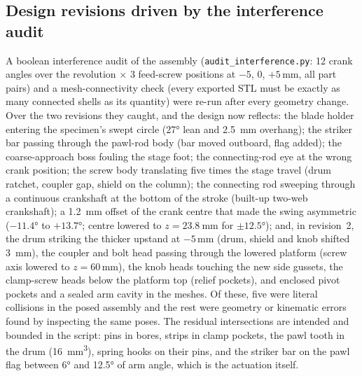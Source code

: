 \subsection{Design revisions driven by the interference audit}
\label{sec:audit}
A boolean interference audit of the assembly (\texttt{audit\_interference.py}: 12 crank angles over the revolution $\times$ 3 feed-screw positions at $-5$, 0, $+5$\,mm, all part pairs) and a mesh-connectivity check (every exported STL must be exactly as many connected shells as its quantity) were re-run after every geometry change. Over the two revisions they caught, and the design now reflects: the blade holder entering the specimen's swept circle (\ang{27} lean and \SI{2.5}{\milli\metre} overhang); the striker bar passing through the pawl-rod body (bar moved outboard, flag added); the coarse-approach boss fouling the stage foot; the connecting-rod eye at the wrong crank position; the screw body translating five times the stage travel (drum ratchet, coupler gap, shield on the column); the connecting rod sweeping through a continuous crankshaft at the bottom of the stroke (built-up two-web crankshaft); a \SI{1.2}{\milli\metre} offset of the crank centre that made the swing asymmetric ($-\ang{11.4}$ to $+\ang{13.7}$; centre lowered to $z=\SI{23.8}{\milli\metre}$ for $\pm\ang{12.5}$); and, in revision~2, the drum striking the thicker upstand at $-5$\,mm (drum, shield and knob shifted \SI{3}{\milli\metre}), the coupler and bolt head passing through the lowered platform (screw axis lowered to $z=60$\,mm), the knob heads touching the new side gussets, the clamp-screw heads below the platform top (relief pockets), and enclosed pivot pockets and a sealed arm cavity in the meshes. Of these, five were literal collisions in the posed assembly and the rest were geometry or kinematic errors found by inspecting the same poses. The residual intersections are intended and bounded in the script: pins in bores, strips in clamp pockets, the pawl tooth in the drum (\SI{16}{\milli\metre\cubed}), spring hooks on their pins, and the striker bar on the pawl flag between \ang{6} and \ang{12.5} of arm angle, which is the actuation itself.
